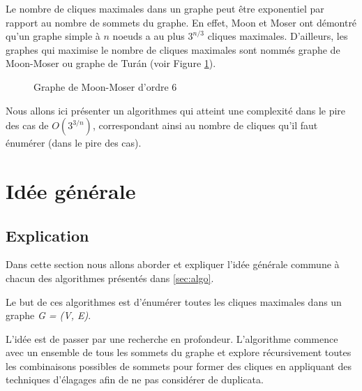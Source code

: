 \documentclass[12pt,a4paper]{article}
\begin{document}
Le nombre de cliques maximales dans un graphe peut être exponentiel par rapport au nombre de sommets du graphe. En effet, Moon et Moser ont démontré qu'un graphe simple à \(n\) noeuds a au plus \( 3^{n/3} \) cliques maximales\cite{MR0182577}. D'ailleurs, les graphes qui maximise le nombre de cliques maximales sont nommés graphe de Moon-Moser ou graphe de Turán (voir Figure \ref{fig:moon-moser}).
\begin{figure}[h!]
    \centering
    \caption{Graphe de Moon-Moser d'ordre 6}
    \label{fig:moon-moser}
\end{figure}

Nous allons ici présenter un algorithmes qui atteint une complexité dans le pire des cas de \(O(3^{3/n})\)\cite{CONTE20221}, correspondant ainsi au nombre de cliques qu'il faut énumérer (dans le pire des cas).

\section{Idée générale}%
\label{sec:idee}

\subsection{Explication}%
\label{subsec:explication}

Dans cette section nous allons aborder et expliquer l'idée générale commune à chacun des algorithmes présentés dans \ref{sec:algo}.

Le but de ces algorithmes est d'énumérer toutes les cliques maximales dans un graphe \emph{G = (V, E)}.

L'idée est de passer par une recherche en profondeur. L'algorithme commence avec un ensemble de tous les sommets du graphe et explore récursivement toutes les combinaisons possibles de sommets pour former des cliques en appliquant des techniques d'élagages afin de ne pas considérer de duplicata.
\end{document}
